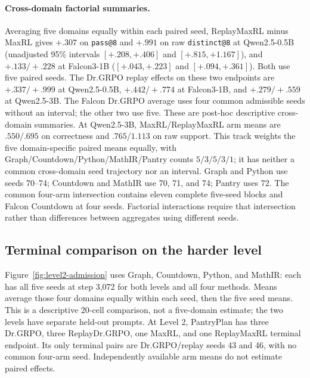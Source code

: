 \documentclass{article}
\newcommand{\1}{\mathbf 1}
\theoremstyle{remark}
\theoremstyle{definition}
\theoremstyle{plain}
\begin{document}
\paragraph{Cross-domain factorial summaries.}
\label{app:factorial-numerical-detail}
Averaging five domains equally within each paired seed, ReplayMaxRL minus
MaxRL gives $+.307$ on \texttt{pass@8} and $+.991$ on raw
\texttt{distinct@8} at Qwen2.5-0.5B (unadjusted 95\% intervals
$[+.208,+.406]$ and $[+.815,+1.167]$), and $+.133/+.228$ at Falcon3-1B
($[+.043,+.223]$ and $[+.094,+.361]$). Both use five paired seeds.
The Dr.GRPO replay effects on these two endpoints are $+.337/+.999$ at
Qwen2.5-0.5B, $+.442/+.774$ at Falcon3-1B, and $+.279/+.559$ at
Qwen2.5-3B. The Falcon Dr.GRPO average uses four common admissible seeds
without an interval; the other two use five. These are post-hoc descriptive
cross-domain summaries. At Qwen2.5-3B, MaxRL/ReplayMaxRL arm means are
$.550/.695$ on correctness and $.765/1.113$ on raw support. This track
weights the five domain-specific paired means equally, with
Graph/Countdown/Python/MathIR/Pantry counts $5/3/5/3/1$; it has neither a
common cross-domain seed trajectory nor an interval. Graph and Python use
seeds 70--74; Countdown and MathIR use 70, 71, and 74; Pantry uses 72.
The common four-arm
intersection contains eleven complete five-seed blocks and Falcon Countdown
at four seeds. Factorial interactions require that intersection rather than
differences between aggregates using different seeds.


\subsection{Terminal comparison on the harder level}
\label{app:level2-interim}

Figure~\ref{fig:level2-admission} uses Graph, Countdown, Python, and MathIR:
each has all five seeds at step 3,072 for both levels and all four methods.
Means average those four domains equally within each seed, then the five
seed means. This is a descriptive 20-cell comparison, not a five-domain
estimate; the two levels have separate held-out prompts. At Level 2,
PantryPlan has three Dr.GRPO, three ReplayDr.GRPO, one MaxRL, and one
ReplayMaxRL terminal endpoint. Its only terminal pairs are Dr.GRPO/replay
seeds 43 and 46, with no common four-arm seed. Independently available
arm means do not estimate paired effects.
\end{document}
